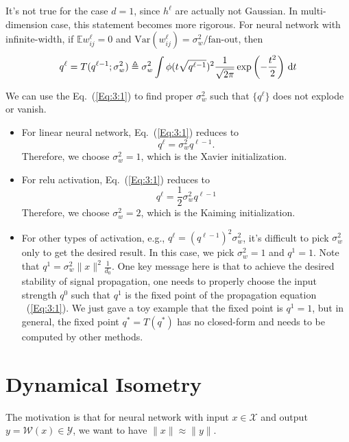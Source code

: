 \begin{remark}
It's not true for the case $d=1$, since $h^{\ell}$ are actually not Gaussian.
In multi-dimension case, this statement becomes more rigorous.
For neural network with infinite-width, if $\mathbb{E}w_{ij}^{\ell}=0$ and $\text{Var}(w_{ij}^{\ell})=\sigma_w^2/\text{fan-out}$,
then
\begin{equation}\label{Eq:3:1}
q^{\ell} = T(q^{\ell-1};\sigma_w^2)\triangleq\sigma_w^2\int\phi(t\sqrt{q^{\ell-1}})^2\frac{1}{\sqrt{2\pi}}\exp\left(-\frac{t^2}{2}\right)\,\mathrm{d} t
\end{equation}
\end{remark}
\begin{example}
We can use the Eq.~(\ref{Eq:3:1}) to find proper $\sigma_w^2$ such that $\{q^{\ell}\}$ does not explode or vanish.
\begin{itemize}
\item
For linear neural network, Eq.~(\ref{Eq:3:1}) reduces to 
\[
q^{\ell}=\sigma_w^2q^{\ell-1}.
\]
Therefore, we choose $\sigma_w^2=1$, which is the Xavier initialization.
\item
For relu activation, Eq.~(\ref{Eq:3:1}) reduces to 
\[
q^{\ell}=\frac{1}{2}\sigma_w^2q^{\ell-1}
\]
Therefore, we choose $\sigma_w^2=2$, which is the Kaiming initialization.
\item
For other types of activation, e.g., $q^{\ell}=(q^{\ell-1})^2\sigma_w^2$, it's difficult to pick $\sigma_w^2$ only to get the desired result. In this case, we pick $\sigma_w^2=1$ and $q^1=1$.
Note that $q^1=\sigma_w^2\|x\|^2\frac{1}{d_0}$. 
One key message here is that to achieve the desired stability of signal propagation, one needs to properly choose the input strength $q^0$ such that $q^1$ is the fixed point of the propagation equation ~(\ref{Eq:3:1}). We just gave a toy example that the fixed point is $q^1=1$, but in general, the fixed point $q^*=T(q^*)$ has no closed-form and needs to be computed by other methods.
\end{itemize}
\end{example}



\section{Dynamical Isometry}
The motivation is that for neural network with input $x\in\mathcal{X}$ and output $y=\mathcal{W}(x)\in\mathcal{Y}$, we want to have $\|x\|\approx\|y\|$.
